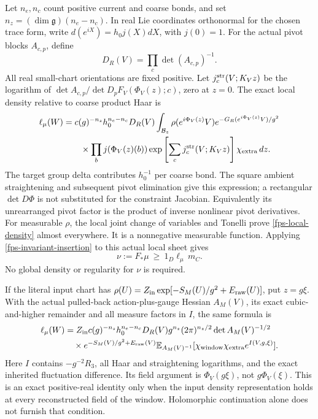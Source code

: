 \documentclass[11pt]{article}
\theoremstyle{remark}
\begin{document}
Let \(n_e,n_c\) count positive current and coarse bonds, and set
\(n_z=(\dim\mathfrak g)(n_e-n_c)\). In real Lie coordinates orthonormal
for the chosen trace form, write
\(d(e^{iX})=h_0j(X)dX\), with \(j(0)=1\).
For the actual pivot blocks \(A_{c,p}\), define
\[
 D_R(V)=\prod_c\det(A_{c,p})^{-1}.
\]
All real small-chart orientations are fixed positive. Let
\(j_c^{\rm str}(V;K_Vz)\) be the logarithm of
\(\det A_{c,p}/\det D_pF_V(\Phi_V(z);c)\), zero at \(z=0\).
The exact local density relative to coarse product Haar is
\begin{align}
 \ell_\mu(W)
 &=c(g)^{-n_s}h_0^{n_e-n_c}D_R(V)
   \int_{\mathcal B_z}\rho(e^{i\Phi_V(z)}V)
       e^{-G_R(e^{i\Phi_V(z)}V)/g^2}\notag\\
 &\qquad\times\prod_b j(\Phi_V(z)(b))
       \exp\left[\sum_c j_c^{\rm str}(V;K_Vz)\right]
       \chi_{\rm extra}\,dz.
 \label{fps-local-density}
\end{align}
The target group delta contributes \(h_0^{-1}\) per coarse bond.
The square ambient straightening and subsequent pivot elimination give
this expression; a rectangular \(\det D\Phi\) is not substituted for
the constraint Jacobian. Equivalently its unrearranged pivot factor is
the product of inverse nonlinear pivot derivatives.
For measurable \(\rho\), the local joint change of variables and
Tonelli prove \eqref{fps-local-density} almost everywhere. It is a
nonnegative measurable function. Applying
\eqref{fps-invariant-insertion} to this actual local sheet gives
\begin{equation}
 \nu:=F_*\mu\ \ge\ 1_D\ell_\mu\,m_C.
 \label{fps-local-domination}
\end{equation}
No global density or regularity for \(\nu\) is required.

If the literal input chart has
\(\rho(U)=Z_{\rm in}\exp[-S_M(U)/g^2+E_{\rm raw}(U)]\),
put \(z=g\xi\). With the actual pulled-back action-plus-gauge Hessian
\(A_M(V)\), its exact cubic-and-higher remainder and all measure factors
in \(I\), the same formula is
\begin{align}
 \ell_\mu(W)
 &=Z_{\rm in}c(g)^{-n_s}h_0^{n_e-n_c}D_R(V)
       g^{n_z}(2\pi)^{n_z/2}\det A_M(V)^{-1/2}\notag\\
 &\quad\times e^{-S_M(V)/g^2+E_{\rm raw}(V)}
 \mathbb E_{A_M(V)^{-1}}
       [\chi_{\rm window}\chi_{\rm extra}e^{I(V,g,\xi)}].
 \label{fps-gaussian-density}
\end{align}
Here \(I\) contains \(-g^{-2}R_3\), all Haar and straightening
logarithms, and the exact inherited fluctuation difference. Its field
argument is \(\Phi_V(g\xi)\), not \(g\Phi_V(\xi)\).
This is an exact positive-real identity only when the input density
representation holds at every reconstructed field of the window.
Holomorphic continuation alone does not furnish that condition.
\end{document}
